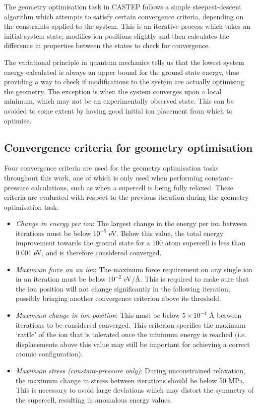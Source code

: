 The geometry optimisation task in CASTEP follows a simple steepest-descent algorithm which attempts to satisfy certain convergence criteria, depending on the constraints applied to the system. This is an iterative process which takes an initial system state, modifies ion positions slightly and then calculates the difference in properties between the states to check for convergence. 

The variational principle in quantum mechanics tells us that the lowest system energy calculated is always an upper bound for the ground state energy, thus providing a way to check if modifications to the system are actually optimising the geometry. The exception is when the system converges upon a local minimum, which may not be an experimentally observed state. This can be avoided to some extent by having good initial ion placement from which to optimise.

\subsection{Convergence criteria for geometry optimisation} \label{convergence_criteria}

Four convergence criteria are used for the geometry optimisation tasks throughout this work, one of which is only used when performing constant-pressure calculations, such as when a supercell is being fully relaxed. These criteria are evaluated with respect to the previous iteration during the geometry optimisation task:

\begin{itemize}
\item \emph{Change in energy per ion}: The largest change in the energy per ion between iterations must be below $10^{-5}$ eV. Below this value, the total energy improvement towards the ground state for a 100 atom supercell is less than 0.001 eV, and is therefore considered converged.
\item \emph{Maximum force on an ion}: The maximum force requirement on any single ion in an iteration must be below $10^{-2}$ eV/\r{A}. This is required to make sure that the ion position will not change significantly in the following iteration, possibly bringing another convergence criterion above its threshold.
\item \emph{Maximum change in ion position}: This must be below $5 \times 10^{-4}$ \r{A} between iterations to be considered converged. This criterion specifies the maximum `rattle' of the ion that is tolerated once the minimum energy is reached (i.e. displacements above this value may still be important for achieving a correct atomic configuration). 
\item \emph{Maximum stress (constant-pressure only)}: During unconstrained relaxation, the maximum change in stress between iterations should be below 50 MPa. This is necessary to avoid large deviations which may distort the symmetry of the supercell, resulting in anomalous energy values.
\end{itemize}

